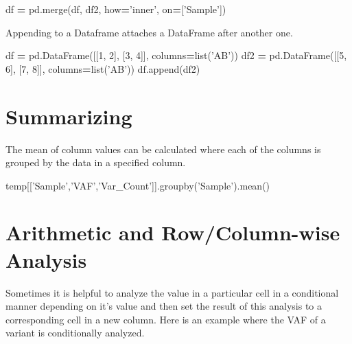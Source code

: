 \documentclass[]{book}
\newenvironment{Shaded}{\begin{snugshade}}{\end{snugshade}}
\newcommand{\DecValTok}[1]{\textcolor[rgb]{0.00,0.00,0.81}{#1}}
\newcommand{\StringTok}[1]{\textcolor[rgb]{0.31,0.60,0.02}{#1}}
\newcommand{\OperatorTok}[1]{\textcolor[rgb]{0.81,0.36,0.00}{\textbf{#1}}}
\newcommand{\BuiltInTok}[1]{#1}
\newcommand{\NormalTok}[1]{#1}
\begin{document}
\begin{Shaded}
\begin{Highlighting}[]
\NormalTok{df }\OperatorTok{=}\NormalTok{ pd.merge(df, df2, how}\OperatorTok{=}\StringTok{'inner'}\NormalTok{, on}\OperatorTok{=}\NormalTok{[}\StringTok{'Sample'}\NormalTok{])}
\end{Highlighting}
\end{Shaded}

Appending to a Dataframe attaches a DataFrame after another one.

\begin{Shaded}
\begin{Highlighting}[]
\NormalTok{df }\OperatorTok{=}\NormalTok{ pd.DataFrame([[}\DecValTok{1}\NormalTok{, }\DecValTok{2}\NormalTok{], [}\DecValTok{3}\NormalTok{, }\DecValTok{4}\NormalTok{]], columns}\OperatorTok{=}\BuiltInTok{list}\NormalTok{(}\StringTok{'AB'}\NormalTok{))}
\NormalTok{df2 }\OperatorTok{=}\NormalTok{ pd.DataFrame([[}\DecValTok{5}\NormalTok{, }\DecValTok{6}\NormalTok{], [}\DecValTok{7}\NormalTok{, }\DecValTok{8}\NormalTok{]], columns}\OperatorTok{=}\BuiltInTok{list}\NormalTok{(}\StringTok{'AB'}\NormalTok{))}
\NormalTok{df.append(df2)}
\end{Highlighting}
\end{Shaded}

\section{Summarizing}\label{summarizing}

The mean of column values can be calculated where each of the columns is
grouped by the data in a specified column.

\begin{Shaded}
\begin{Highlighting}[]
\NormalTok{temp[[}\StringTok{'Sample'}\NormalTok{,}\StringTok{'VAF'}\NormalTok{,}\StringTok{'Var_Count'}\NormalTok{]].groupby(}\StringTok{'Sample'}\NormalTok{).mean()}
\end{Highlighting}
\end{Shaded}

\section{Arithmetic and Row/Column-wise
Analysis}\label{arithmetic-and-rowcolumn-wise-analysis}

Sometimes it is helpful to analyze the value in a particular cell in a
conditional manner depending on it's value and then set the result of
this analysis to a corresponding cell in a new column. Here is an
example where the VAF of a variant is conditionally analyzed.
\end{document}
